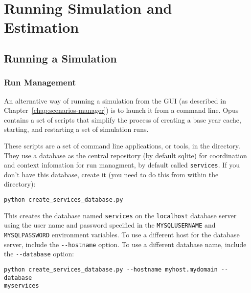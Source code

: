 
\chapter{Running Simulation and Estimation}
\label{part:running-simulation}
%
\section{Running a Simulation}
% 
\subsection{Run Management}
\label{sec:run-manager}
%
An alternative way of running a simulation from the GUI (as described in Chapter~\ref{chap:scenarios-manager})
is to launch it from a command line.
Opus contains a set of scripts that simplify the
process of creating a base year cache, starting, and restarting a set of simulation runs.

These scripts are a set of command line applications, or tools, in the
 directory.  They use a database as the central
repository (by default sqlite) for coordination and context infomation for run managment, by
default called \verb|services|.  If you don't have this database, create it
(you need to do this from within the 
directory):
\pythonindex
\begin{verbatim}
python create_services_database.py
\end{verbatim}
This creates the database named \verb|services| on the \verb|localhost|
database server using the user name and password specified in the
\verb|MYSQLUSERNAME| \mysqlusernameindex and \verb|MYSQLPASSWORD| \mysqlpasswordindex environment variables. \environmentvariablesindex To use a
different host for the database server, include the \verb|--hostname|
option. To use a different database name, include the \verb|--database|
option:
\pythonindex
\begin{verbatim}
python create_services_database.py --hostname myhost.mydomain --database
myservices
\end{verbatim}

